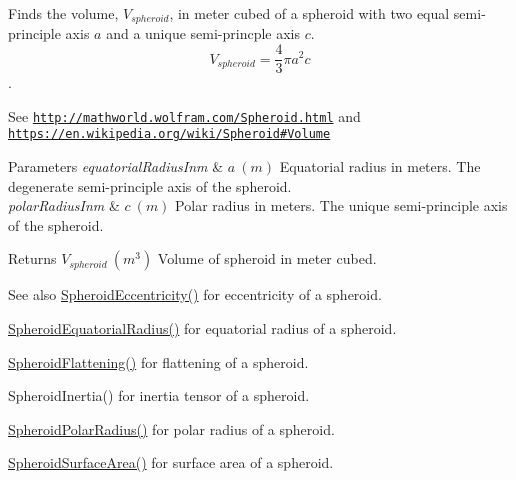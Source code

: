 Finds the volume, $V_{spheroid}$, in meter cubed of a spheroid with two equal semi-\/principle axis $a$ and a unique semi-\/princple axis $c$. \[ V_{spheroid}=\frac{4}{3}\pi a^2 c \]. 

See \href{http://mathworld.wolfram.com/Spheroid.html}{\tt http\+://mathworld.\+wolfram.\+com/\+Spheroid.\+html} and \href{https://en.wikipedia.org/wiki/Spheroid#Volume}{\tt https\+://en.\+wikipedia.\+org/wiki/\+Spheroid\#\+Volume}


\begin{DoxyParams}{Parameters}
{\em equatorial\+Radius\+Inm} & $ a\ (m)$ Equatorial radius in meters. The degenerate semi-\/principle axis of the spheroid. \\
\hline
{\em polar\+Radius\+Inm} & $ c\ (m)$ Polar radius in meters. The unique semi-\/principle axis of the spheroid. \\
\hline
\end{DoxyParams}
\begin{DoxyReturn}{Returns}
$ V_{spheroid}\ (m^3)$ Volume of spheroid in meter cubed. 
\end{DoxyReturn}
\begin{DoxySeeAlso}{See also}
\mbox{\hyperlink{group___e_g_x_math-_geometry-3_d-_spheroid-_eccentricity_gab45680528a41bb7a5e15ddc0059156dd}{Spheroid\+Eccentricity()}} for eccentricity of a spheroid. 

\mbox{\hyperlink{group___e_g_x_math-_geometry-3_d-_spheroid-_equatorial_radius_ga1cbe564fee1b509c622d1c6d276158cd}{Spheroid\+Equatorial\+Radius()}} for equatorial radius of a spheroid. 

\mbox{\hyperlink{group___e_g_x_math-_geometry-3_d-_spheroid-_flattening_ga05e3be91f5f7fbaa9371687aa3834179}{Spheroid\+Flattening()}} for flattening of a spheroid. 

Spheroid\+Inertia() for inertia tensor of a spheroid. 

\mbox{\hyperlink{group___e_g_x_math-_geometry-3_d-_spheroid-_polar_radius_gad4791a46a7efe39c63c03d2366fdd3d2}{Spheroid\+Polar\+Radius()}} for polar radius of a spheroid. 

\mbox{\hyperlink{group___e_g_x_math-_geometry-3_d-_spheroid-_surface_area_ga5a3580e7ded82cb678a558905f41ae49}{Spheroid\+Surface\+Area()}} for surface area of a spheroid. 
\end{DoxySeeAlso}
